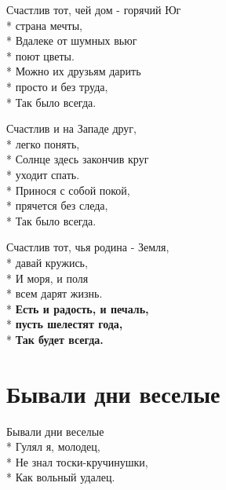 \medskip

\begin{minipage}{\linewidth}
Счастлив тот, чей дом - горячий Юг\\*
страна мечты,\\*
Вдалеке от шумных вьюг\\*
поют цветы.\\*
Можно их друзьям дарить\\*
просто и без труда,\\*
Так было всегда.\\
\end{minipage}\par\medskip\nobreak

\medskip

\begin{minipage}{\linewidth}
Счастлив и на Западе друг,\\*
легко понять,\\*
Солнце здесь закончив круг\\*
уходит спать.\\*
Принося с собой покой,\\*
прячется без следа,\\*
Так было всегда.\\
\end{minipage}\par\medskip\nobreak

\medskip

\begin{minipage}{\linewidth}
Счастлив тот, чья родина - Земля,\\*
давай кружись,\\*
И моря, и поля\\*
всем дарят жизнь.\\*
\textbf{Есть и радость, и печаль,}\\*
\textbf{пусть шелестят года,}\\*
\textbf{Так будет всегда.}\\
\end{minipage}

\vspace{\fill}\newpage

\section{Бывали дни веселые}
\label{song:Бывали_дни_веселые}

\medskip

\begin{minipage}{\linewidth}
Бывали дни веселые\\*
Гулял я, молодец,\\*
Не знал тоски-кручинушки,\\*
Как вольный удалец.\\
\end{minipage}\par\medskip\nobreak

